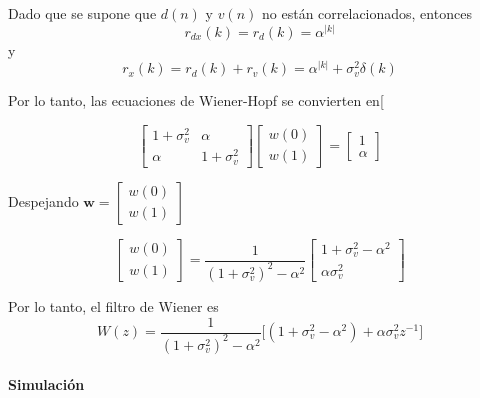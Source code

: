 \documentclass[a4paper]{article}
\begin{document}
 Dado que se supone que $d(n)$ y $v(n)$ no están correlacionados, entonces
 \begin{equation}
 	r_{dx}(k) = r_d(k) = \alpha^{|k|}
 \end{equation}
 y
 \begin{equation}
 	r_x(k) = r_d(k) + r_v(k) = \alpha^{|k|} + \sigma_v^2 \delta(k)
 \end{equation}
 
 Por lo tanto, las ecuaciones de Wiener-Hopf se convierten en[
 
 \begin{equation}
 	\begin{bmatrix}
 		1 + \sigma_v^2 & \alpha \\
 		\alpha & 1 + \sigma_v^2
 	\end{bmatrix}
 	\begin{bmatrix}
 		w(0) \\
 		w(1)
 	\end{bmatrix}
 	=
 	\begin{bmatrix}
 		1 \\
 		\alpha
 	\end{bmatrix}
 \end{equation}



Despejando  $\mathbf{w} = 	\begin{bmatrix}
	w(0) \\
	w(1)
\end{bmatrix}$


\begin{equation}
	\begin{bmatrix}
		w(0) \\
		w(1)
	\end{bmatrix}
	=
	\frac{1}{(1 + \sigma_v^2)^2 - \alpha^2}
	\begin{bmatrix}
		1 + \sigma_v^2 - \alpha^2 \\
		\alpha\sigma_v^2
	\end{bmatrix}
\end{equation}

Por lo tanto, el filtro de Wiener es
\begin{equation}
	W(z) = \frac{1}{(1 + \sigma_v^2)^2 - \alpha^2}\bigl[(1 + \sigma_v^2 - \alpha^2) + \alpha\sigma_v^2 z^{-1}\bigr]
\end{equation}


\paragraph{Simulación}
\end{document}
